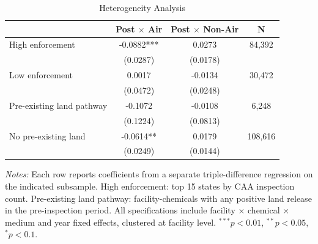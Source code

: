\begin{table}[htbp]
\centering
\caption{Heterogeneity Analysis}
\label{tab:heterogeneity}
\begin{tabular}{lccc}
\toprule
& Post $\times$ Air & Post $\times$ Non-Air & N \\
\midrule
High enforcement & -0.0882*** & 0.0273 & 84,392 \\
& (0.0287) & (0.0178) & \\
Low enforcement & 0.0017 & -0.0134 & 30,472 \\
& (0.0472) & (0.0248) & \\[3pt]
\midrule
Pre-existing land pathway & -0.1072 & -0.0108 & 6,248 \\
& (0.1224) & (0.0813) & \\
No pre-existing land & -0.0614** & 0.0179 & 108,616 \\
& (0.0249) & (0.0144) & \\[3pt]

\bottomrule
\end{tabular}
\begin{minipage}{0.95\textwidth}
\vspace{0.3em}
\footnotesize \textit{Notes:} Each row reports coefficients from a separate triple-difference regression on the indicated subsample. High enforcement: top 15 states by CAA inspection count. Pre-existing land pathway: facility-chemicals with any positive land release in the pre-inspection period. All specifications include facility $\times$ chemical $\times$ medium and year fixed effects, clustered at facility level. $^{***}p<0.01$, $^{**}p<0.05$, $^{*}p<0.1$.
\end{minipage}
\end{table}
